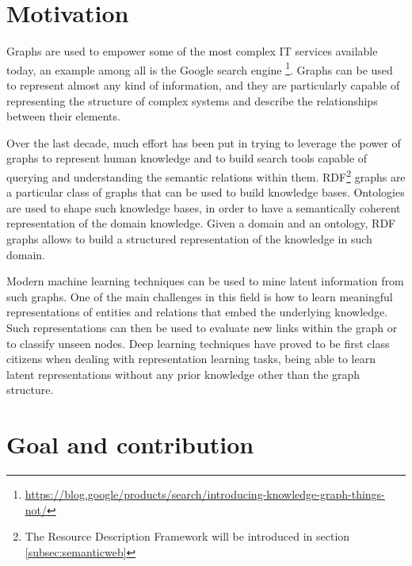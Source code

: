 \documentclass[%
    corpo=13.5pt,
    twoside,
    oldstyle,
    tipotesi=magistrale,
    greek,
    evenboxes
]{toptesi}
\begin{document}
\section{Motivation}

Graphs are used to empower some of the most complex IT services available
today, an example among all is the Google search engine
\footnote{\url{https://blog.google/products/search/introducing-knowledge-graph-things-not/}}.
Graphs can be used to represent almost any kind of information, and they are
particularly capable of representing the structure of complex systems and
describe the relationships between their elements.

Over the last decade, much effort has been put in trying to leverage the power
of graphs to represent human knowledge and to build search tools capable of
querying and understanding the semantic relations within them.
RDF\footnote{The Resource Description Framework will be introduced in
section \ref{subsec:semanticweb}} graphs are a
particular class of graphs that can be used to build knowledge
bases. Ontologies are used to shape such knowledge bases, in order to have a
semantically coherent representation of the domain knowledge.
Given a domain and an ontology, RDF graphs allows to build a structured
representation of the knowledge in such domain.

Modern machine learning techniques can be used to mine latent information
from such graphs. One of the main challenges in this field is how to learn
meaningful representations of entities and relations that embed
the underlying knowledge. Such representations can then be used to evaluate
new links within the graph or to classify unseen nodes.
Deep learning techniques have proved to be first class citizens when
dealing with representation learning tasks, being able to learn latent
representations without any prior knowledge other than the graph structure.


\section{Goal and contribution}
\end{document}
